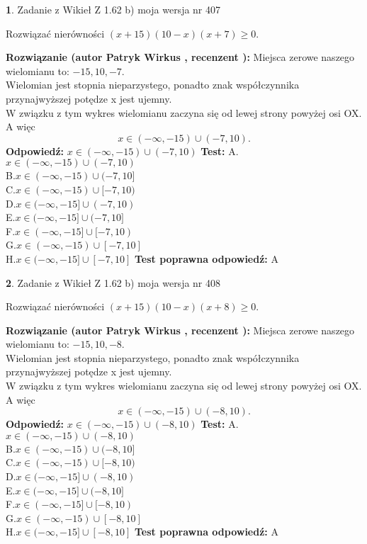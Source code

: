 \documentclass[12pt, a4paper]{article}
\theoremstyle{definition} %
\newtheorem{zad}{}
\newcommand{\zadStart}[1]{\begin{zad}#1\newline}
\newcommand{\zadStop}{\end{zad}}
\newcommand{\rozwStart}[2]{\noindent \textbf{Rozwiązanie (autor #1 , recenzent #2): }\newline}
\newcommand{\rozwStop}{\newline}
\newcommand{\odpStart}{\noindent \textbf{Odpowiedź:}\newline}
\newcommand{\odpStop}{\newline}
\newcommand{\testStart}{\noindent \textbf{Test:}\newline}
\newcommand{\testStop}{\newline}
\newcommand{\kluczStart}{\noindent \textbf{Test poprawna odpowiedź:}\newline}
\newcommand{\kluczStop}{\newline}
\begin{document}
\zadStart{Zadanie z Wikieł Z 1.62 b) moja wersja nr 407}

Rozwiązać nierówności $(x+15)(10-x)(x+7)\ge0$.
\zadStop
\rozwStart{Patryk Wirkus}{}
Miejsca zerowe naszego wielomianu to: $-15, 10, -7$.\\
Wielomian jest stopnia nieparzystego, ponadto znak współczynnika przy\linebreak najwyższej potędze x jest ujemny.\\ W związku z tym wykres wielomianu zaczyna się od lewej strony powyżej osi OX. A więc $$x \in (-\infty,-15) \cup (-7,10).$$
\rozwStop
\odpStart
$x \in (-\infty,-15) \cup (-7,10)$
\odpStop
\testStart
A.$x \in (-\infty,-15) \cup (-7,10)$\\
B.$x \in (-\infty,-15) \cup (-7,10]$\\
C.$x \in (-\infty,-15) \cup [-7,10)$\\
D.$x \in (-\infty,-15] \cup (-7,10)$\\
E.$x \in (-\infty,-15] \cup (-7,10]$\\
F.$x \in (-\infty,-15] \cup [-7,10)$\\
G.$x \in (-\infty,-15) \cup [-7,10]$\\
H.$x \in (-\infty,-15] \cup [-7,10]$
\testStop
\kluczStart
A
\kluczStop



\zadStart{Zadanie z Wikieł Z 1.62 b) moja wersja nr 408}

Rozwiązać nierówności $(x+15)(10-x)(x+8)\ge0$.
\zadStop
\rozwStart{Patryk Wirkus}{}
Miejsca zerowe naszego wielomianu to: $-15, 10, -8$.\\
Wielomian jest stopnia nieparzystego, ponadto znak współczynnika przy\linebreak najwyższej potędze x jest ujemny.\\ W związku z tym wykres wielomianu zaczyna się od lewej strony powyżej osi OX. A więc $$x \in (-\infty,-15) \cup (-8,10).$$
\rozwStop
\odpStart
$x \in (-\infty,-15) \cup (-8,10)$
\odpStop
\testStart
A.$x \in (-\infty,-15) \cup (-8,10)$\\
B.$x \in (-\infty,-15) \cup (-8,10]$\\
C.$x \in (-\infty,-15) \cup [-8,10)$\\
D.$x \in (-\infty,-15] \cup (-8,10)$\\
E.$x \in (-\infty,-15] \cup (-8,10]$\\
F.$x \in (-\infty,-15] \cup [-8,10)$\\
G.$x \in (-\infty,-15) \cup [-8,10]$\\
H.$x \in (-\infty,-15] \cup [-8,10]$
\testStop
\kluczStart
A
\kluczStop
\end{document}
